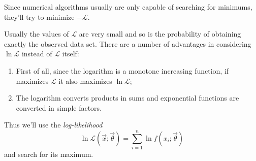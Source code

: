 \documentclass[
	10pt,
	draft
]{scrreprt}
\newcommand{\lkhd}{\ensuremath{\mathcal{L}}}
\begin{document}
Since numerical algorithms usually are only capable of searching for minimums, they'll try to minimize $-\lkhd$.


{\color{red}
Usually the values of $\lkhd$ are very small and so is the probability of obtaining exactly the observed data set.
}
There are a number of advantages in considering $\ln\lkhd$ instead of $\lkhd$ itself:
\begin{enumerate}
	\item
First of all, since the logarithm is a monotone increasing function, if \vec{\hat\theta} maximizes $\lkhd$ it also maximizes $\ln\lkhd$;
	\item
The logarithm converts products in sums and exponential functions are converted in simple factors.
\end{enumerate}
Thus we'll use the \emph{log-likelihood}
\begin{equation}
\ln \lkhd(\vec{x};\vec{\theta}) = \sum_{i=1}^n \ln f(x_i;\vec{\theta})
\end{equation}
and search for its maximum.
\end{document}
